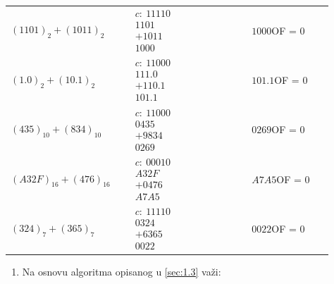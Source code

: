 \documentclass[a4paper,11pt]{article}
\numberwithin{equation}{section}
\newcommand{\redlinija}{\arrayrulecolor{black!28}\specialrule{0.3pt}{2pt}{2pt}\arrayrulecolor{black}}
\begin{document}
\begin{longtable}{p{0.34\linewidth} p{0.34\linewidth} p{0.23\linewidth}}
\redlinija
$(1101)_{2}+(1011)_{2}$ & $\begin{array}{r}c:\ 11110\\1101\\+1011\\\hline 1000\end{array}$ & $1000$\newline OF = 0\\[5pt]
\redlinija
$(1.0)_{2}+(10.1)_{2}$ & $\begin{array}{r}c:\ 11000\\111.0\\+110.1\\\hline 101.1\end{array}$ & $101.1$\newline OF = 0\\[5pt]
\redlinija
$(435)_{10}+(834)_{10}$ & $\begin{array}{r}c:\ 11000\\0435\\+9834\\\hline 0269\end{array}$ & $0269$\newline OF = 0\\[5pt]
\redlinija
$(A32F)_{16}+(476)_{16}$ & $\begin{array}{r}c:\ 00010\\A32F\\+0476\\\hline A7A5\end{array}$ & $A7A5$\newline OF = 0\\[5pt]
\redlinija
$(324)_{7}+(365)_{7}$ & $\begin{array}{r}c:\ 11110\\0324\\+6365\\\hline 0022\end{array}$ & $0022$\newline OF = 0\\[5pt]
\bottomrule\end{longtable}


\begin{enumerate}[label=\alph*),start=2,leftmargin=*]
\item Na osnovu algoritma opisanog u \ref{sec:1.3} važi:

\end{enumerate}
\end{document}
